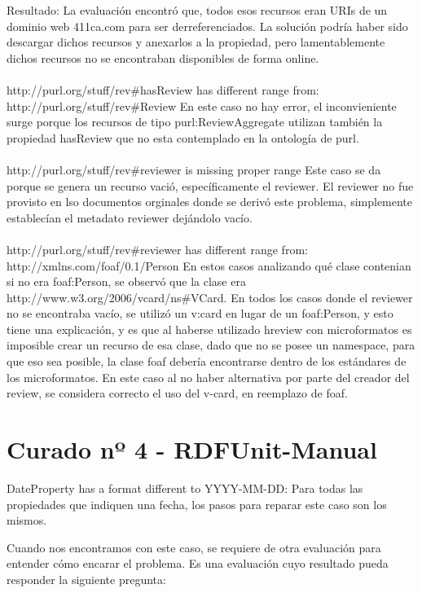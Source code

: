 Resultado:
La evaluación encontró que, todos esos recursos eran URIs de un dominio web 411ca.com para ser derreferenciados. La solución podría haber sido 
descargar dichos recursos y anexarlos a la propiedad, pero lamentablemente dichos recursos no se encontraban disponibles de forma online.
\\\\
http://purl.org/stuff/rev\#hasReview has different range from:\\\noindent http://purl.org/stuff/rev\#Review 
En este caso no hay error, el inconvieniente surge porque los recursos de tipo purl:ReviewAggregate utilizan también la propiedad hasReview
que no esta contemplado en la ontología de purl.
\\\\
http://purl.org/stuff/rev\#reviewer is missing proper range
Este caso se da \\\noindent porque se genera un recurso vació, específicamente el reviewer. El reviewer no fue provisto en lso documentos orginales donde 
se derivó este problema, simplemente establecían el metadato reviewer dejándolo vacío.
\\\\
http://purl.org/stuff/rev\#reviewer has different range from:\\\noindent http://xmlns.com/foaf/0.1/Person
En estos casos analizando qué clase contenian si no era foaf:Person, se observó que la clase era \\\noindent http://www.w3.org/2006/vcard/ns\#VCard.
En todos los casos donde el reviewer no se encontraba vacío, se utilizó un v:card en lugar de un foaf:Person, y esto tiene una explicación, 
y es que al haberse utilizado hreview con microformatos es imposible crear un recurso de esa clase, dado que no se posee un namespace, para que 
eso sea posible, la clase foaf debería encontrarse dentro de los estándares de los microformatos. 
En este caso al no haber alternativa por parte del creador del review, se considera correcto el uso del v-card, en reemplazo de foaf.

\section{Curado nº 4 - RDFUnit-Manual}
\label{section:curado-manual}

{DateProperty} has a format different to YYYY-MM-DD:
Para todas las propiedades que indiquen una fecha, los pasos para reparar este caso son los mismos.

Cuando nos encontramos con este caso, se requiere de otra evaluación para entender cómo encarar el problema. Es una evaluación cuyo resultado
pueda responder la siguiente pregunta:


